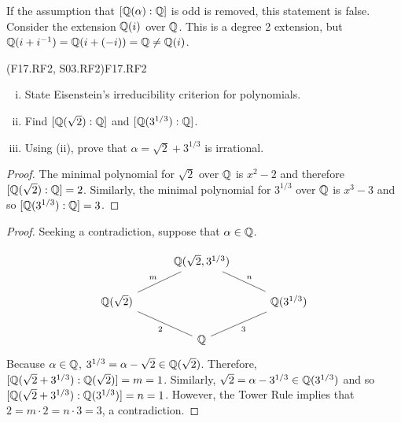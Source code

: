 \documentclass[../AlgebraQualSolutions.tex]{subfiles}
\begin{document}
If the assumption that $[\mathbb{Q}(\alpha): \mathbb{Q}]$ is odd is removed, this statement is false. Consider the extension $\mathbb{Q}(i)$ over $\mathbb{Q}$. This is a degree 2 extension, but $\mathbb{Q}(i + i^{-1}) = \mathbb{Q}(i + (-i)) = \mathbb{Q} \neq \mathbb{Q}(i)$.

\begin{prob}{(F17.RF2, S03.RF2)}{F17.RF2}
	\begin{enumerate}[(i)]
		\item State Eisenstein's irreducibility criterion for polynomials.
		\item Find $[\mathbb{Q}(\sqrt 2): \mathbb{Q}]$ and $[\mathbb{Q}(3^{1/3}): \mathbb{Q}]$.
		\item Using (ii), prove that $\alpha = \sqrt{2}+3^{1/3}$ is irrational.
	\end{enumerate}
\end{prob}

\begin{proof}
	The minimal polynomial for $\sqrt2$ over $\mathbb{Q}$ is $x^2 - 2$ and therefore $[\mathbb{Q}(\sqrt 2): \mathbb{Q}] =2$. Similarly, the minimal polynomial for $3^{1/3}$ over $\mathbb{Q}$ is $x^3 - 3$ and so $[\mathbb{Q}(3^{1/3}): \mathbb{Q}] = 3$.
\end{proof}

\begin{proof}
	Seeking a contradiction, suppose that $\alpha \in \mathbb{Q}$.

	\[
		\begin{tikzcd}[column sep=1cm]
		  & \Q(\sqrt2,3^{1/3}) & \\
		  \Q(\sqrt2) \ar[ru, no head,"m"]& & \ar[lu, no head,"n"'] \Q(3^{1/3}) \\
		  & \Q \ar[lu, no head, "2"] \ar[ru, no head, "3"']&
		\end{tikzcd}
		\]
	Because $\alpha \in \mathbb{Q}$, $3^{1/3} = \alpha - \sqrt2 \in \mathbb{Q}(\sqrt2)$. Therefore, $[\mathbb{Q}(\sqrt2 + 3^{1/3}): \mathbb{Q}(\sqrt2)] = m = 1$. Similarly, $\sqrt{2} = \alpha - 3^{1/3} \in \mathbb{Q}(3^{1/3})$ and so $[\mathbb{Q}(\sqrt2 + 3^{1/3}): \mathbb{Q}(3^{1/3})] = n = 1$. However, the Tower Rule implies that $2 = m\cdot2 = n\cdot 3 = 3$, a contradiction. 
\end{proof}
\end{document}
